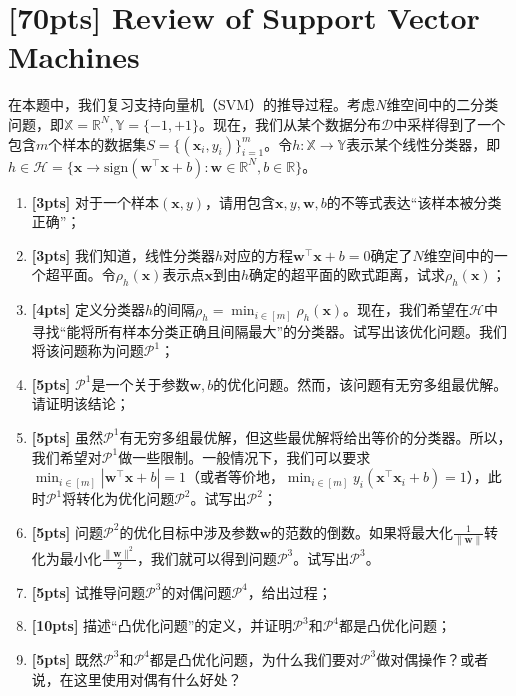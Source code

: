\documentclass[a4paper,UTF8]{article}
\theoremstyle{definition}
\begin{document}
\section{[70pts] Review of Support Vector Machines}
在本题中，我们复习支持向量机（SVM）的推导过程。考虑$N$维空间中的二分类问题，即$\mathbb{X}=\mathbb{R}^{N},\mathbb{Y}=\{-1,+1\}$。现在，我们从某个数据分布$\mathcal{D}$中采样得到了一个包含$m$个样本的数据集$S=\{(\mathbf{x}_i,y_i)\}_{i=1}^{m}$。令$h:\mathbb{X}\rightarrow\mathbb{Y}$表示某个线性分类器，即$h\in\mathcal{H}=\{\mathbf{x}\rightarrow \mathrm{sign}(\mathbf{w}^\top\mathbf{x}+b):\mathbf{w}\in\mathbb{R}^{N},b\in\mathbb{R}\}$。
\begin{enumerate}[(1)]
	\item \textbf{[3pts]} 对于一个样本$(\mathbf{x},y)$，请用包含$\mathbf{x},y,\mathbf{w},b$的不等式表达“该样本被分类正确”；
	\item \textbf{[3pts]} 我们知道，线性分类器$h$对应的方程$\mathbf{w}^\top\mathbf{x}+b=0$确定了$N$维空间中的一个超平面。令$\rho_h(\mathbf{x})$表示点$\mathbf{x}$到由$h$确定的超平面的欧式距离，试求$\rho_h(\mathbf{x})$；
	\item \textbf{[4pts]} 定义分类器$h$的间隔$\rho_h=\min_{i\in[m]}\rho_h(\mathbf{x})$。现在，我们希望在$\mathcal{H}$中寻找“能将所有样本分类正确且间隔最大”的分类器。试写出该优化问题。我们将该问题称为问题$\mathcal{P}^{1}$；
	\item \textbf{[5pts]} $\mathcal{P}^{1}$是一个关于参数$\mathbf{w},b$的优化问题。然而，该问题有无穷多组最优解。请证明该结论；
	\item \textbf{[5pts]} 虽然$\mathcal{P}^{1}$有无穷多组最优解，但这些最优解将给出等价的分类器。所以，我们希望对$\mathcal{P}^{1}$做一些限制。一般情况下，我们可以要求$\min_{i\in[m]}|\mathbf{w}^\top\mathbf{x}+b|=1$（或者等价地，$\min_{i\in[m]}y_i(\mathbf{x}^\top\mathbf{x}_i+b)=1$），此时$\mathcal{P}^{1}$将转化为优化问题$\mathcal{P}^{2}$。试写出$\mathcal{P}^{2}$；
	\item \textbf{[5pts]} 问题$\mathcal{P}^{2}$的优化目标中涉及参数$\mathbf{w}$的范数的倒数。如果将最大化$\frac{1}{\|\mathbf{w}\|}$转化为最小化$\frac{\|\mathbf{w}\|^2}{2}$，我们就可以得到问题$\mathcal{P}^{3}$。试写出$\mathcal{P}^{3}$。
	\item \textbf{[5pts]} 试推导问题$\mathcal{P}^{3}$的对偶问题$\mathcal{P}^{4}$，给出过程；
	\item \textbf{[10pts]} 描述“凸优化问题”的定义，并证明$\mathcal{P}^{3}$和$\mathcal{P}^{4}$都是凸优化问题；
	\item \textbf{[5pts]} 既然$\mathcal{P}^{3}$和$\mathcal{P}^{4}$都是凸优化问题，为什么我们要对$\mathcal{P}^{3}$做对偶操作？或者说，在这里使用对偶有什么好处？

\end{enumerate}
\end{document}
